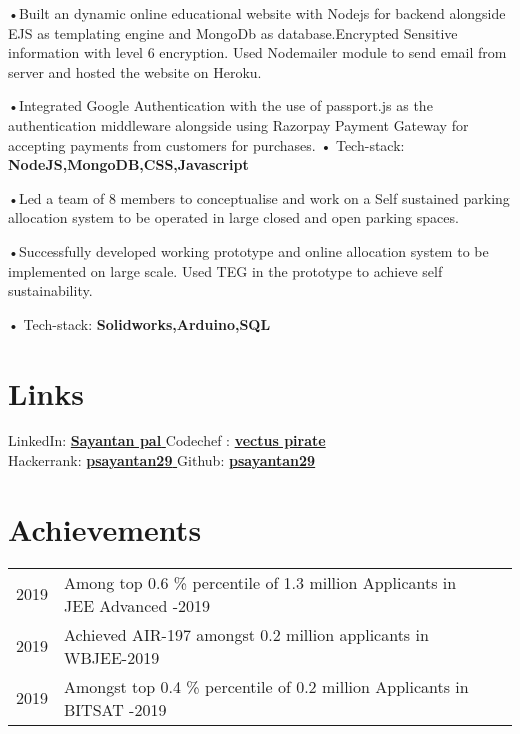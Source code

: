 \documentclass[]{deedy-resume-openfont}
\begin{document}
\begin{minipage}[t]{0.66\textwidth}
\sectionsep
{}
\item •Built an dynamic online educational website with Nodejs for backend alongside EJS as templating engine and MongoDb as database.Encrypted Sensitive information with level 6 encryption. Used Nodemailer module to send email from server and hosted the website on Heroku.
\item •Integrated Google Authentication with the use of passport.js as the  authentication middleware alongside using Razorpay Payment Gateway for accepting payments from customers for purchases.\newline
  • Tech-stack: \textbf{NodeJS,MongoDB,CSS,Javascript}
\sectionsep

\item •Led a team of 8 members to conceptualise and work on a Self sustained parking allocation system to be operated in large closed and open parking spaces.
\item •Successfully developed working prototype and online allocation system to be implemented on large scale. Used TEG in the prototype to achieve self sustainability.

• Tech-stack: \textbf{Solidworks,Arduino,SQL}

\section{Links} 
\textbullet LinkedIn:  \href{https://www.linkedin.com/in/sayantan-pal-54a967205/}{\bf Sayantan pal \faExternalLink} \hspace{1.5cm}
\textbullet Codechef : \href{https://www.codechef.com/users/vectus_pirate}{\bf vectus pirate \faExternalLink} \\
\textbullet Hackerrank:  \href{https://www.hackerrank.com/psayantan29}{\bf psayantan29 \faExternalLink} \hspace{1cm}
\textbullet Github:  \href{https://github.com/psayantan29}{\bf psayantan29 \faExternalLink}

\sectionsep

\section{Achievements} 
\begin{tabular}{rll}
2019	     & Among top 0.6 \% percentile of 1.3 million Applicants in JEE Advanced -2019 \\
2019        & Achieved AIR-197 amongst 0.2 million applicants in WBJEE-2019\\ 
2019	     & Amongst top 0.4 \% percentile of 0.2 million Applicants in BITSAT -2019 \\


\end{tabular}
\end{minipage}
\end{document}
